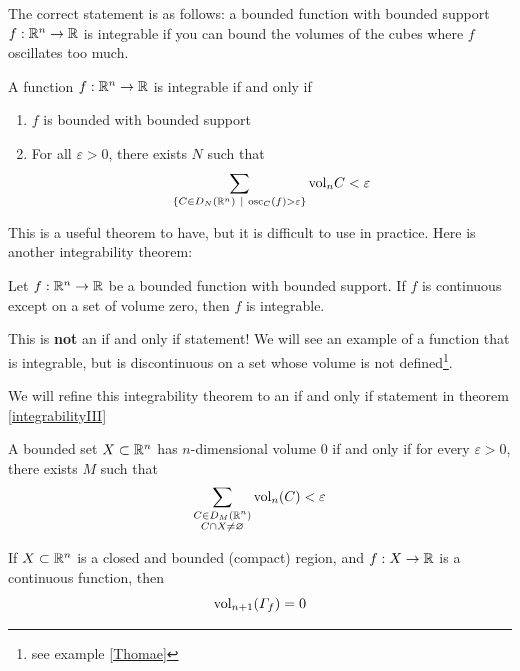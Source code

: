 The correct statement is as follows: a bounded function with bounded support $f: \mathbb{R}^n \to \mathbb{R}$ is integrable if you can bound the volumes of the cubes where $f$ oscillates too much.

\begin{theorem}\label{IntegrabilityI}
    A function $f: \mathbb{R}^n \to \mathbb{R}$ is integrable if and only if
    \begin{enumerate}
        \item $f$ is bounded with bounded support
        \item For all $\varepsilon > 0$, there exists $N$ such that $$\sum_{\{C \in D_N(\R^n) \ | \ \text{osc}_C(f) > \varepsilon \}} \textnormal{vol}_n C < \varepsilon$$
    \end{enumerate}
    \end{theorem}

This is a useful theorem to have, but it is difficult to use in practice.  Here is another integrability theorem:

\begin{theorem}\label{IntegrabilityII}
    Let $f: \mathbb{R}^n \to \mathbb{R}$ be a bounded function with bounded support.  If $f$ is continuous except on a set of volume zero, then $f$ is integrable.  
\end{theorem}

\begin{remark}
This is \textbf{not} an if and only if statement! We will see an example of a function that is integrable, but is discontinuous on a set whose volume is not defined\footnote{see example \ref{Thomae}}.

We will refine this integrability theorem to an if and only if statement in theorem \ref{integrabilityIII}
\end{remark}

\begin{proposition}
    A bounded set $X \subset \mathbb{R}^n$ has $n$-dimensional volume 0 if and only if for every $\varepsilon > 0$, there exists $M$ such that
    $$\sum_{\substack{C \in D_M(\mathbb{R}^n) \\ C \cap X \neq \varnothing}} \textnormal{vol}_n(C) < \varepsilon$$
\end{proposition}

\begin{example}
If $X \subset \mathbb{R}^n$ is a closed and bounded (compact) region, and $f : X \to \mathbb{R}$ is a continuous function, then $$\textnormal{vol}_{n+1}(\Gamma_f) = 0$$ 
\end{example}

